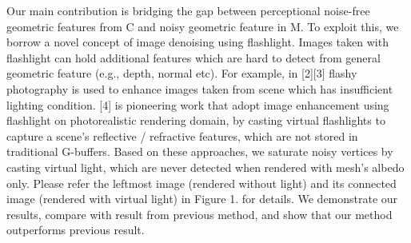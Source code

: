 Our main contribution is bridging the gap 
between perceptional noise-free geometric features from C 
and noisy geometric feature in M. 
To exploit this, we borrow a novel concept of 
image denoising using flashlight. Images taken with flashlight can hold additional features 
which are hard to detect from general geometric feature (e.g., depth, normal etc). 
For example, in [2][3] flashy photography is used to enhance images taken from scene which has insufficient lighting condition. 
[4] is pioneering work that adopt image enhancement using flashlight 
on photorealistic rendering domain, by casting virtual flashlights 
to capture a scene’s reflective / refractive features, 
which are not stored in traditional G-buffers. 
Based on these approaches, we saturate noisy vertices 
by casting virtual light, which are never detected 
when rendered with mesh’s albedo only. 
Please refer the leftmost image (rendered without light) 
and its connected image (rendered with virtual light) in Figure 1. for details. 
We demonstrate our results, compare with result from previous method, 
and show that our method outperforms previous result.
